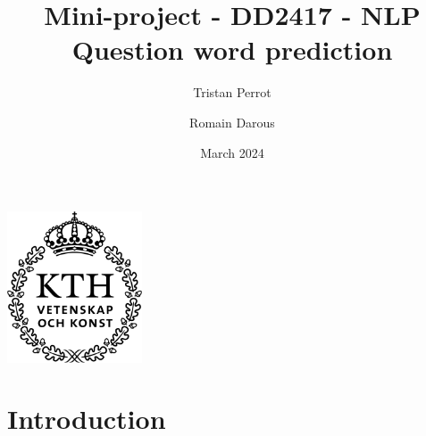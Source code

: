 \documentclass{article}
\title{Mini-project - DD2417 - NLP \\ Question word prediction}
\author{Tristan Perrot \and Romain Darous}
\date{March 2024}
\begin{document}
\maketitle
\begin{center}
\includegraphics[width = 40mm]{images/KTH_logo_RGB_svart.png}
\end{center}

\section{Introduction}
\end{document}
